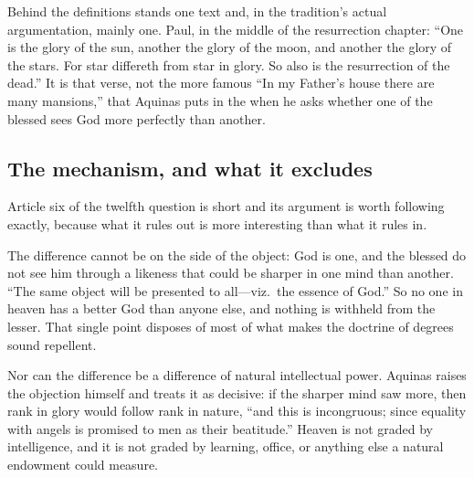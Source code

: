 Behind the definitions stands one text and, in the tradition's actual argumentation, mainly one. Paul, in the middle of the resurrection chapter: ``One is the glory of the sun, another the glory of the moon, and another the glory of the stars. For star differeth from star in glory. So also is the resurrection of the dead.'' It is that verse, not the more famous ``In my Father's house there are many mansions,'' that Aquinas puts in the  when he asks whether one of the blessed sees God more perfectly than another.

\subsection{The mechanism, and what it excludes}

Article six of the twelfth question is short and its argument is worth following exactly, because what it rules out is more interesting than what it rules in.

The difference cannot be on the side of the object: God is one, and the blessed do not see him through a likeness that could be sharper in one mind than another. ``The same object will be presented to all---viz.\ the essence of God.'' So no one in heaven has a better God than anyone else, and nothing is withheld from the lesser. That single point disposes of most of what makes the doctrine of degrees sound repellent.

Nor can the difference be a difference of natural intellectual power. Aquinas raises the objection himself and treats it as decisive: if the sharper mind saw more, then rank in glory would follow rank in nature, ``and this is incongruous; since equality with angels is promised to men as their beatitude.'' Heaven is not graded by intelligence, and it is not graded by learning, office, or anything else a natural endowment could measure.

